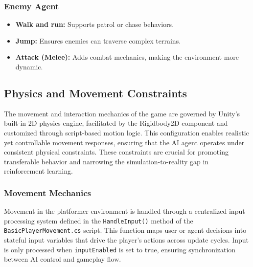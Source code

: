 \documentclass[12pt,oneside,openright,a4paper]{cpe-english-project}
\begin{document}
\subsubsection{Enemy Agent}
\begin{itemize}
\item  \textbf{Walk and run:} Supports patrol or chase behaviors.
\item  \textbf{Jump:} Ensures enemies can traverse complex terrains.
\item  \textbf{Attack (Melee):} Adds combat mechanics, making the environment more dynamic.
\end{itemize}
\subsection{Physics and Movement Constraints}
The movement and interaction mechanics of the game are governed by Unity’s built-in 2D physics engine, facilitated by the Rigidbody2D component and customized through script-based motion logic. This configuration enables realistic yet controllable movement responses, ensuring that the AI agent operates under consistent physical constraints. These constraints are crucial for promoting transferable behavior and narrowing the simulation-to-reality gap in reinforcement learning.

\subsubsection{Movement Mechanics}
Movement in the platformer environment is handled through a centralized input-processing system defined in the \texttt{HandleInput()} method of the \texttt{BasicPlayerMovement.cs} script. This function maps user or agent decisions into stateful input variables that drive the player’s actions across update cycles. Input is only processed when \texttt{inputEnabled} is set to true, ensuring synchronization between AI control and gameplay flow. 
\end{document}
